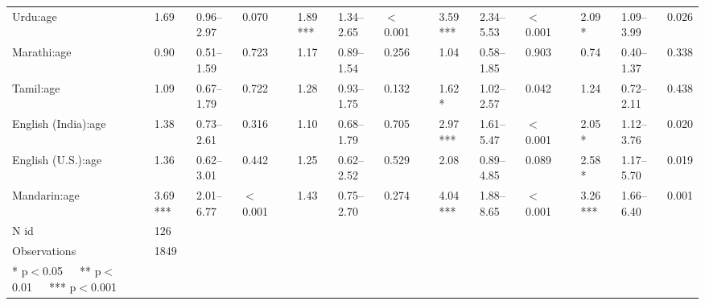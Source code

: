 \begin{table}[ht]
\begin{tabular}{}
Urdu:age & 1.69 & 0.96--2.97 & 0.070 &  & 1.89 *** & 1.34--2.65 & $<$0.001 &  & 3.59 *** & 2.34--5.53 & $<$0.001 &  & 2.09 * & 1.09--3.99 & 0.026 \\ 

Marathi:age & 0.90 & 0.51--1.59 & 0.723 &  & 1.17 & 0.89--1.54 & 0.256 &  & 1.04 & 0.58--1.85 & 0.903 &  & 0.74 & 0.40--1.37 & 0.338 \\ 

Tamil:age & 1.09 & 0.67--1.79 & 0.722 &  & 1.28 & 0.93--1.75 & 0.132 &  & 1.62 * & 1.02--2.57 & 0.042 &  & 1.24 & 0.72--2.11 & 0.438 \\ 

English (India):age & 1.38 & 0.73--2.61 & 0.316 &  & 1.10 & 0.68--1.79 & 0.705 &  & 2.97 *** & 1.61--5.47 & $<$0.001 &  & 2.05 * & 1.12--3.76 & 0.020 \\ 

English (U.S.):age & 1.36 & 0.62--3.01 & 0.442 &  & 1.25 & 0.62--2.52 & 0.529 &  & 2.08 & 0.89--4.85 & 0.089 &  & 2.58 * & 1.17--5.70 & 0.019 \\ 

Mandarin:age & 3.69 *** & 2.01--6.77 & $<$0.001 &  & 1.43 & 0.75--2.70 & 0.274 &  & 4.04 *** & 1.88--8.65 & $<$0.001 &  & 3.26 *** & 1.66--6.40 & 0.001 \\ 

N id & 126 &  &  &  &  &  &  &  &  &  &  &  &  &  &  \\ 

Observations & 1849 &  &  &  &  &  &  &  &  &  &  &  &  &  &  \\ 

* p$<$0.05   ** p$<$0.01   *** p$<$0.001 &  &  &  &  &  &  &  &  &  &  &  &  &  &  &  \\ 
   \hline
\end{tabular}
\end{table}
